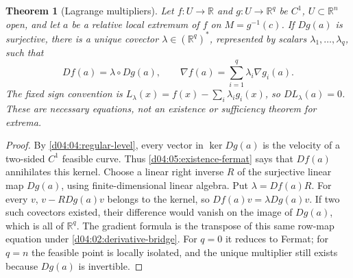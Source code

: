 \documentclass[11pt,oneside,openany]{book}
\newtheorem{theorem}{Theorem}[chapter]
\theoremstyle{definition}
\theoremstyle{remark}
\newcommand{\R}{\mathbb R}
\begin{document}
\begin{theorem}[Lagrange multipliers]\label{d04:05:lagrange}
Let $f:U\to\R$ and $g:U\to\R^q$ be $C^1$, $U\subset\R^n$ open,
and let $a$ be a relative local extremum of $f$ on $M=g^{-1}(c)$.
If $Dg(a)$ is surjective, there is a unique covector
$\lambda\in(\R^q)^*$, represented by scalars $\lambda_1,\ldots,\lambda_q$,
such that
\[
 Df(a)=\lambda\circ Dg(a),\qquad
 \nabla f(a)=\sum_{i=1}^q\lambda_i\nabla g_i(a).
\]
The fixed sign convention is
$L_\lambda(x)=f(x)-\sum_i\lambda_i g_i(x)$, so $DL_\lambda(a)=0$.
These are necessary equations, not an existence or sufficiency theorem
for extrema.
\end{theorem}
\begin{proof}
By \cref{d04:04:regular-level}, every vector in $\ker Dg(a)$ is the
velocity of a two-sided $C^1$ feasible curve. Thus
\cref{d04:05:existence-fermat} says that $Df(a)$ annihilates this kernel.
Choose a linear right inverse $R$ of the surjective linear map $Dg(a)$,
using finite-dimensional linear algebra. Put $\lambda=Df(a)R$.
For every $v$, $v-RDg(a)v$ belongs to the kernel, so
$Df(a)v=\lambda Dg(a)v$. If two such covectors existed, their difference
would vanish on the image of $Dg(a)$, which is all of $\R^q$.
The gradient formula is the transpose of this same row-map equation under
\cref{d04:02:derivative-bridge}. For $q=0$ it reduces to Fermat; for
$q=n$ the feasible point is locally isolated, and the unique multiplier
still exists because $Dg(a)$ is invertible.
\end{proof}
\end{document}
